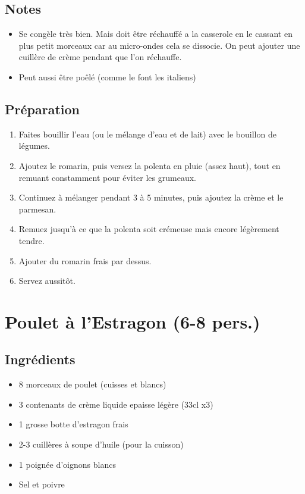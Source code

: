\subsection{Notes}\label{notes-2}

\begin{itemize}

\item
  Se congèle très bien. Mais doit être réchauffé a la casserole en le
  cassant en plus petit morceaux car au micro-ondes cela se dissocie. On
  peut ajouter une cuillère de crème pendant que l'on réchauffe.
\item
  Peut aussi être poêlé (comme le font les italiens)
\end{itemize}

\subsection{Préparation}\label{pruxe9paration-3}

\begin{enumerate}
\def\labelenumi{\arabic{enumi}.}

\item
  Faites bouillir l'eau (ou le mélange d'eau et de lait) avec le
  bouillon de légumes.
\item
  Ajoutez le romarin, puis versez la polenta en pluie (assez haut), tout
  en remuant constamment pour éviter les grumeaux.
\item
  Continuez à mélanger pendant 3 à 5 minutes, puis ajoutez la crème et
  le parmesan.
\item
  Remuez jusqu'à ce que la polenta soit crémeuse mais encore légèrement
  tendre.
\item
  Ajouter du romarin frais par dessus.
\item
  Servez aussitôt.
\end{enumerate}

\section{Poulet à l'Estragon (6-8
pers.)}\label{poulet-uxe0-lestragon-6-8-pers.}

\subsection{Ingrédients}\label{ingruxe9dients-10}

\begin{itemize}

\item
  8 morceaux de poulet (cuisses et blancs)
\item
  3 contenants de crème liquide epaisse légère (33cl x3)
\item
  1 grosse botte d'estragon frais
\item
  2-3 cuillères à soupe d'huile (pour la cuisson)
\item
  1 poignée d'oignons blancs
\item
  Sel et poivre
\end{itemize}

